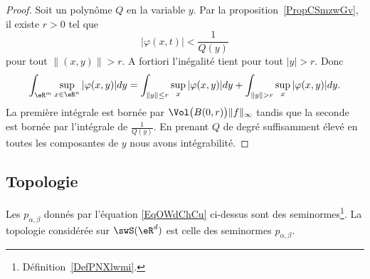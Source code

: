 \begin{proof}
	Soit un polynôme \( Q\) en la variable \( y\). Par la proposition~\ref{PropCSmzwGv}, il existe \( r>0\) tel que
	\begin{equation}
		| \varphi(x,t) |<\frac{1}{ Q(y) }
	\end{equation}
	pour tout \( \| (x,y) \|>r\). A fortiori l'inégalité tient pour tout \( | y |>r\). Donc
	\begin{equation}
		\int_{\eR^m}\sup_{x\in \eR^n}| \varphi(x,y) |dy=\int_{\| y \|\leq r}\sup_{x}| \varphi(x,y) |dy+\int_{ \| y \|>r  }\sup_{x}| \varphi(x,y) |dy.
	\end{equation}
	La première intégrale est bornée par \( \Vol\big( B(0,r) \big)\| f \|_{\infty}\) tandis que la seconde est bornée par l'intégrale de \( \frac{1}{ Q(y) }\). En prenant \( Q\) de degré suffisamment élevé en toutes les composantes de \( y\) nous avons intégrabilité.
\end{proof}

\subsection{Topologie}

\begin{lemmaDef}        \label{LEMDEFooZEFVooMMmiBr}
	Les \( p_{\alpha,\beta}\) donnés par l'équation \eqref{EqOWdChCu} ci-dessus sont des seminormes\footnote{Définition~\ref{DefPNXlwmi}.}. La topologie considérée sur \( \swS(\eR^d)\) est celle des seminormes \( p_{\alpha,\beta}\).
\end{lemmaDef}

